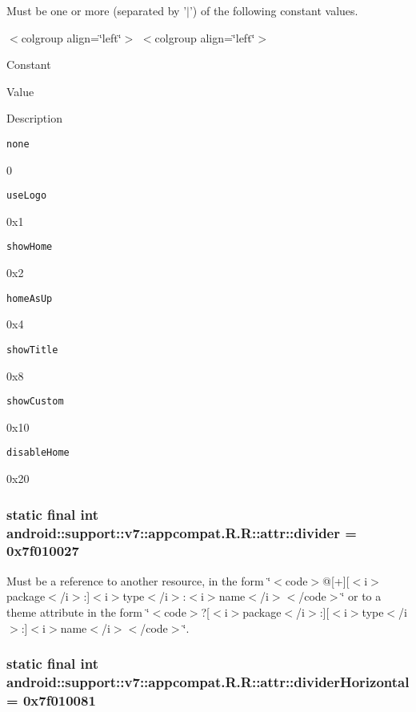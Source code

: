 Must be one or more (separated by '$|$') of the following constant values. \begin{TabularC}{0}
\hline
\end{TabularC}
$<$colgroup align=\char`\"{}left\char`\"{}$>$ $<$colgroup align=\char`\"{}left\char`\"{}$>$ 

Constant

Value

Description 

{\tt none}

0

{\tt useLogo}

0x1

{\tt showHome}

0x2

{\tt homeAsUp}

0x4

{\tt showTitle}

0x8

{\tt showCustom}

0x10

{\tt disableHome}

0x20\hypertarget{classandroid_1_1support_1_1v7_1_1appcompat_1_1_r_1_1attr_5890e14d386c4cfc70082aea5b1f91a8}{
\subsubsection[{divider}]{\setlength{\rightskip}{0pt plus 5cm}static final int android::support::v7::appcompat.R.R::attr::divider = 0x7f010027}}
\label{classandroid_1_1support_1_1v7_1_1appcompat_1_1_r_1_1attr_5890e14d386c4cfc70082aea5b1f91a8}


Must be a reference to another resource, in the form \char`\"{}$<$code$>$@\mbox{[}+\mbox{]}\mbox{[}$<$i$>$package$<$/i$>$:\mbox{]}$<$i$>$type$<$/i$>$:$<$i$>$name$<$/i$>$$<$/code$>$\char`\"{} or to a theme attribute in the form \char`\"{}$<$code$>$?\mbox{[}$<$i$>$package$<$/i$>$:\mbox{]}\mbox{[}$<$i$>$type$<$/i$>$:\mbox{]}$<$i$>$name$<$/i$>$$<$/code$>$\char`\"{}. \hypertarget{classandroid_1_1support_1_1v7_1_1appcompat_1_1_r_1_1attr_39fa1b4839ffb74fe8f1a5873c6bc7ed}{
\subsubsection[{dividerHorizontal}]{\setlength{\rightskip}{0pt plus 5cm}static final int android::support::v7::appcompat.R.R::attr::dividerHorizontal = 0x7f010081}}
\label{classandroid_1_1support_1_1v7_1_1appcompat_1_1_r_1_1attr_39fa1b4839ffb74fe8f1a5873c6bc7ed}


